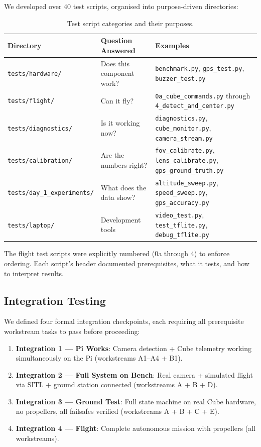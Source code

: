 We developed over 40 test scripts, organised into purpose-driven directories:

\begin{table}[htbp]
\centering
\compactTable
\caption{Test script categories and their purposes.}
\label{tab:test_scripts}
\begin{tabularx}{\linewidth}{l l X}
\toprule
\textbf{Directory} & \textbf{Question Answered} & \textbf{Examples} \\
\midrule
\texttt{tests/hardware/} & Does this component work? & \texttt{benchmark.py}, \texttt{gps\_test.py}, \texttt{buzzer\_test.py} \\
\texttt{tests/flight/} & Can it fly? & \texttt{0a\_cube\_commands.py} through \texttt{4\_detect\_and\_center.py} \\
\texttt{tests/diagnostics/} & Is it working now? & \texttt{diagnostics.py}, \texttt{cube\_monitor.py}, \texttt{camera\_stream.py} \\
\texttt{tests/calibration/} & Are the numbers right? & \texttt{fov\_calibrate.py}, \texttt{lens\_calibrate.py}, \texttt{gps\_ground\_truth.py} \\
\texttt{tests/day\_1\_experiments/} & What does the data show? & \texttt{altitude\_sweep.py}, \texttt{speed\_sweep.py}, \texttt{gps\_accuracy.py} \\
\texttt{tests/laptop/} & Development tools & \texttt{video\_test.py}, \texttt{test\_tflite.py}, \texttt{debug\_tflite.py} \\
\bottomrule
\end{tabularx}
\end{table}

The flight test scripts were explicitly numbered (0a through 4) to enforce ordering. Each script's header documented prerequisites, what it tests, and how to interpret results.

\subsection{Integration Testing}

We defined four formal integration checkpoints, each requiring all prerequisite workstream tasks to pass before proceeding:

\begin{enumerate}
  \item \textbf{Integration 1 --- Pi Works}: Camera detection + Cube telemetry working simultaneously on the Pi (workstreams A1--A4 + B1).
  \item \textbf{Integration 2 --- Full System on Bench}: Real camera + simulated flight via SITL + ground station connected (workstreams A + B + D).
  \item \textbf{Integration 3 --- Ground Test}: Full state machine on real Cube hardware, no propellers, all failsafes verified (workstreams A + B + C + E).
  \item \textbf{Integration 4 --- Flight}: Complete autonomous mission with propellers (all workstreams).
\end{enumerate}

